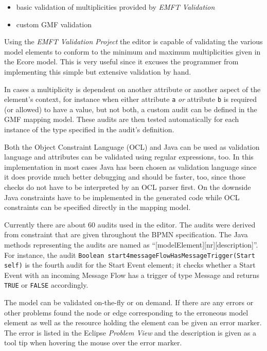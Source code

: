 \begin{itemize}
	\item basic validation of multiplicities provided by \emph{EMFT Validation}
	\item custom GMF validation
\end{itemize}

Using the \emph{EMFT Validation Project} the editor is capable of validating the various model elements to conform to the minimum and maximum multiplicities given in the Ecore model. This is very useful since it excuses the programmer from implementing this simple but extensive validation by hand.

In cases a multiplicity is dependent on another attribute or another aspect of the element's context, for instance when either attribute \verb|a| \emph{or} attribute \verb|b| is required (or allowed) to have a value, but not both, a custom audit can be defined in the GMF mapping model. These audits are then tested automatically for each instance of the type specified in the audit's definition.

Both the Object Constraint Language (OCL) \cite{spec_ocl} and Java can be used as validation language and attributes can be validated using regular expressions, too. In this implementation in most cases Java has been chosen as validation language since it does provide much better debugging and should be faster, too, since those checks do not have to be interpreted by an OCL parser first. On the downside Java constraints have to be implemented in the generated code while OCL constraints can be specified directly in the mapping model.

Currently there are about 60 audits used in the editor. The audits were derived from constraint that are given throughout the BPMN specification. The Java methods representing the audits are named as ``[modelElement][nr][description]''. For instance, the audit \verb|Boolean start4messageFlowHasMessageTrigger(Start self)| is the fourth audit for the Start Event element; it checks whether a Start Event with an incoming Message Flow has a trigger of type Message and returns \verb|TRUE| or \verb|FALSE| accordingly.

The model can be validated on-the-fly or on demand. If there are any errors or other problems found the node or edge corresponding to the erroneous model element as well as the resource holding the element can be given an error marker. The error is listed in the Eclipse \emph{Problem View} and the description is given as a tool tip when hovering the mouse over the error marker.



